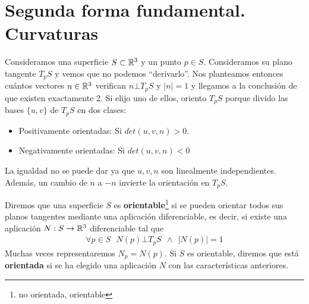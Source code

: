 \chapter{Segunda forma fundamental. Curvaturas}

Consideramos una superficie $S\subset \mathbb{R}^3$ y un punto $p\in S$. Consideramos su plano tangente $T_pS$ y vemos que no podemos ``derivarlo''. Nos planteamos entonces cuántos vectores $n\in \mathbb{R}^3$ verifican $n\bot T_pS$ y $|n|=1$ y llegamos a la conclusión de que existen exactamente 2. Si elijo uno de ellos, oriento $T_pS$ porque divido las bases $\{u,v\}$ de $T_pS$ en dos clases:
\begin{itemize}
    \item Positivamente orientadas: Si $det(u,v,n)>0$.
    \item Negativamente orientadas: Si $det(u,v,n)<0$
\end{itemize}
La igualdad no se puede dar ya que $u,v,n$ son linealmente independientes. Además, un cambio de $n$ a $-n$ invierte la orientación en $T_pS$.

\begin{definicion}
    Diremos que una superficie $S$ es \textbf{orientable}\footnote{no orientada, orientable} si se pueden orientar todos sus planos tangentes mediante una aplicación diferenciable, es decir, si existe una aplicación $N: S \to \mathbb{R}^3$ diferenciable tal que 
    \begin{gather*}
        \forall p \in S \ \ \ N(p)\bot T_pS\ \ \wedge\ \ |N(p)|=1
    \end{gather*}
    Muchas veces representaremos $N_p=N(p)$. Si $S$ es orientable, diremos que está \textbf{orientada} si se ha elegido una aplicación $N$ con las características anteriores.
\end{definicion}

